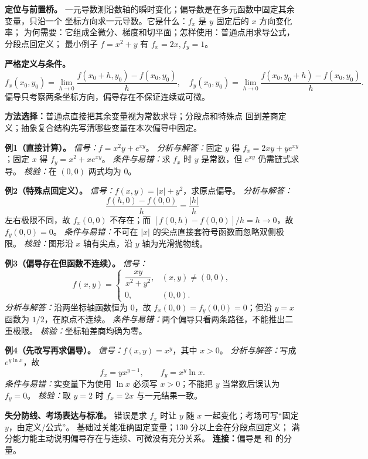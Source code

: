 
\begin{knowledgeBox}
\textbf{定位与前置桥。}
一元导数测沿数轴的瞬时变化；偏导数是在多元函数中固定其余变量，只沿一个
坐标方向求一元导数。它是什么：\(f_x\) 是 \(y\) 固定后的 \(x\) 方向变化率；
为何需要：它组成全微分、梯度和切平面；怎样使用：普通点用求导公式，分段点回定义；
最小例子 \(f=x^2+y\) 有 \(f_x=2x,f_y=1\)。

\textbf{严格定义与条件。}
\[
f_x(x_0,y_0)=\lim_{h\to0}
\frac{f(x_0+h,y_0)-f(x_0,y_0)}h,
\quad
f_y(x_0,y_0)=\lim_{h\to0}
\frac{f(x_0,y_0+h)-f(x_0,y_0)}h.
\]
偏导只考察两条坐标方向，偏导存在不保证连续或可微。

\textbf{方法选择：}普通点直接把其余变量视为常数求导；分段点和特殊点
回到差商定义；抽象复合结构先写清哪些变量在本次偏导中固定。

\textbf{例1（直接计算）。}
\emph{信号：}\(f=x^2y+e^{xy}\)。
\emph{分析与解答：}固定 \(y\) 得
\(f_x=2xy+ye^{xy}\)；固定 \(x\) 得
\(f_y=x^2+xe^{xy}\)。
\emph{条件与易错：}求 \(f_x\) 时 \(y\) 是常数，但 \(e^{xy}\) 仍需链式求导。
\emph{核验：}在 \((0,0)\) 两式均为 \(0\)。

\textbf{例2（特殊点回定义）。}
\emph{信号：}\(f(x,y)=|x|+y^2\)，求原点偏导。
\emph{分析与解答：}
\[
\frac{f(h,0)-f(0,0)}h=\frac{|h|}{h}
\]
左右极限不同，故 \(f_x(0,0)\) 不存在；而
\([f(0,h)-f(0,0)]/h=h\to0\)，故 \(f_y(0,0)=0\)。
\emph{条件与易错：}不可在 \(|x|\) 的尖点直接套符号函数而忽略双侧极限。
\emph{核验：}图形沿 \(x\) 轴有尖点，沿 \(y\) 轴为光滑抛物线。

\textbf{例3（偏导存在但函数不连续）。}
\emph{信号：}
\[
f(x,y)=
\begin{cases}\dfrac{xy}{x^2+y^2},&(x,y)\ne(0,0),\\0,&(0,0).\end{cases}
\]
\emph{分析与解答：}沿两坐标轴函数恒为 \(0\)，故
\(f_x(0,0)=f_y(0,0)=0\)；但沿 \(y=x\) 函数为 \(1/2\)，在原点不连续。
\emph{条件与易错：}两个偏导只看两条路径，不能推出二重极限。
\emph{核验：}坐标轴差商均确为零。

\textbf{例4（先改写再求偏导）。}
\emph{信号：}\(f(x,y)=x^y\)，其中 \(x>0\)。
\emph{分析与解答：}写成 \(e^{y\ln x}\)，故
\[
f_x=yx^{y-1},\qquad f_y=x^y\ln x.
\]
\emph{条件与易错：}实变量下为使用 \(\ln x\) 必须写 \(x>0\)；不能把 \(y\)
当常数后误认为 \(f_y=0\)。
\emph{核验：}取 \(y=2\) 时 \(f_x=2x\) 与一元结果一致。

\textbf{失分防线、考场表达与标准。}
错误是求 \(f_x\) 时让 \(y\) 随 \(x\) 一起变化；考场可写“固定 \(y\)，由定义/公式”。
基础过关能准确固定变量；130 分以上会在分段点回定义；
满分能力能主动说明偏导存在与连续、可微没有充分关系。
\textbf{连接：}偏导是
和
的分量。
\end{knowledgeBox}


